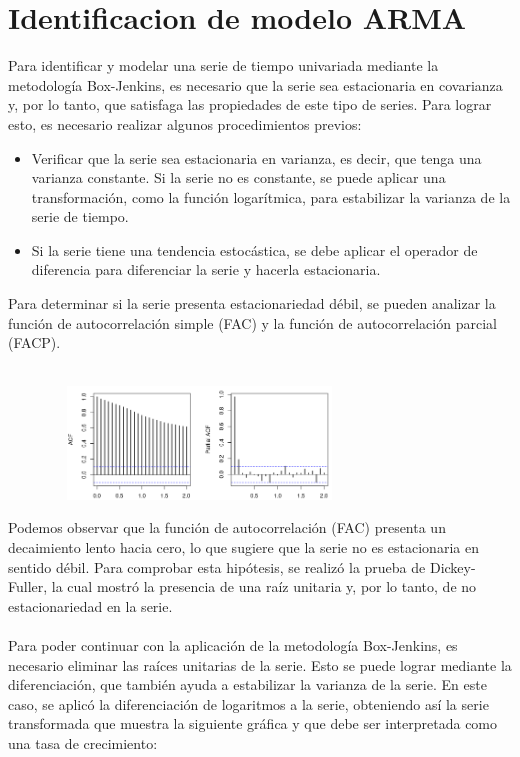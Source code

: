 \documentclass[11pt]{article}
\begin{document}
\section{Identificacion de modelo ARMA}

    Para identificar y modelar una serie de tiempo univariada mediante la metodología Box-Jenkins, es necesario que la serie sea estacionaria en covarianza y, por lo tanto, que satisfaga las propiedades de este tipo de series. Para lograr esto, es necesario realizar algunos procedimientos previos:
    \begin{itemize}
        \item Verificar que la serie sea estacionaria en varianza, es decir, que tenga una varianza constante. Si la serie no es constante, se puede aplicar una transformación, como la función logarítmica, para estabilizar la varianza de la serie de tiempo.
        \item Si la serie tiene una tendencia estocástica, se debe aplicar el operador de diferencia para diferenciar la serie y hacerla estacionaria.   
    \end{itemize}
    Para determinar si la serie presenta estacionariedad débil, se pueden analizar la función de autocorrelación simple (FAC) y la función de autocorrelación parcial (FACP).\\~\\
    
\begin{figure}
  \centering
  \includegraphics[width=8cm, height=3cm]{Imagenes/acf_pacf1.png}
\end{figure}
    
    Podemos observar que la función de autocorrelación (FAC) presenta un decaimiento lento hacia cero, lo que sugiere que la serie no es estacionaria en sentido débil. Para comprobar esta hipótesis, se realizó la prueba de Dickey-Fuller, la cual mostró la presencia de una raíz unitaria y, por lo tanto, de no estacionariedad en la serie.\\~\\
    Para poder continuar con la aplicación de la metodología Box-Jenkins, es necesario eliminar las raíces unitarias de la serie. Esto se puede lograr mediante la diferenciación, que también ayuda a estabilizar la varianza de la serie. En este caso, se aplicó la diferenciación de logaritmos a la serie, obteniendo así la serie transformada que muestra la siguiente gráfica y que debe ser interpretada como una tasa de crecimiento:
    
\end{document}
